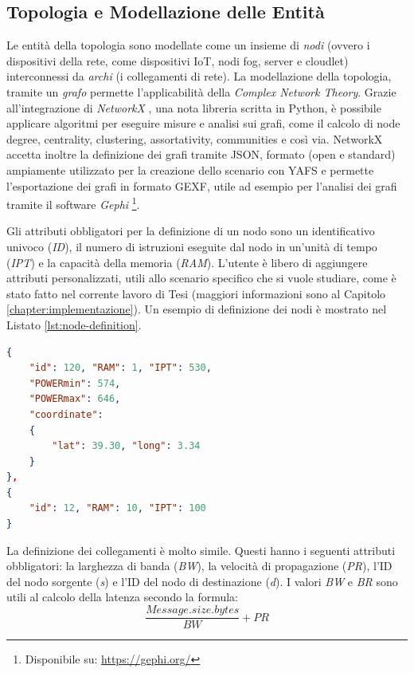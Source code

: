 \subsection{Topologia e Modellazione delle Entità}

Le entità della topologia sono modellate come un insieme di \textit{nodi} (ovvero i dispositivi della rete, come dispositivi IoT, nodi fog, server e cloudlet) interconnessi da \textit{archi} (i collegamenti di rete). La modellazione della topologia, tramite un \textit{grafo} permette l'applicabilità della \textit{Complex Network Theory}. Grazie all'integrazione di \textit{NetworkX}  \cite{NetworkX}, una nota libreria scritta in Python, è possibile applicare algoritmi per eseguire misure e analisi sui grafi, come il calcolo di node degree, centrality, clustering, assortativity, communities e così via. NetworkX accetta inoltre la definizione dei grafi tramite JSON, formato (open e standard) ampiamente utilizzato per la creazione dello scenario con YAFS e permette l'esportazione dei grafi in formato GEXF, utile ad esempio per l'analisi dei grafi tramite il software \textit{Gephi} \footnote{Disponibile su: \url{https://gephi.org/}}.

Gli attributi obbligatori per la definizione di un nodo sono un identificativo univoco (\textit{ID}), il numero di istruzioni eseguite dal nodo in un'unità di tempo (\textit{IPT}) e la capacità della memoria (\textit{RAM}). L'utente è libero di aggiungere attributi personalizzati, utili allo scenario specifico che si vuole studiare, come è stato fatto nel corrente lavoro di Tesi (maggiori informazioni sono al Capitolo \ref{chapter:implementazione}). Un esempio di definizione dei nodi è mostrato nel Listato \ref{lst:node-definition}. 
\begin{lstlisting}[language=json, caption={Definizione di due nodi Fog utilizzando la rappresentazione JSON. \cite{YAFSSimulator}}, captionpos=b, label={lst:node-definition}]
{
    "id": 120, "RAM": 1, "IPT": 530,
    "POWERmin": 574,
    "POWERmax": 646,
    "coordinate": 
    {
        "lat": 39.30, "long": 3.34
    }
},
{
    "id": 12, "RAM": 10, "IPT": 100
}
\end{lstlisting}

La definizione dei collegamenti è molto simile. Questi hanno i seguenti attributi obbligatori: la larghezza di banda (\textit{BW}), la velocità di propagazione (\textit{PR}), l'ID del nodo sorgente (\textit{s}) e l'ID del nodo di destinazione (\textit{d}). I valori \textit{BW} e \textit{BR} sono utili al calcolo della latenza secondo la formula:
$$\frac{Message.size.bytes}{BW} + PR$$

